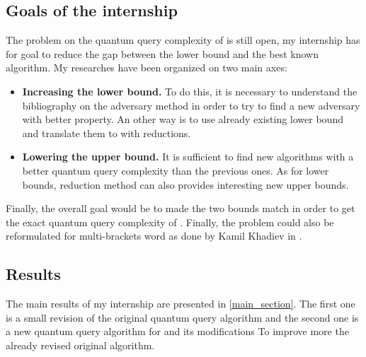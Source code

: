 \subsection{Goals of the internship}
The problem on the quantum query complexity of  is still open, my internship
has for goal to reduce the gap between the lower bound and the best known algorithm.
My researches have been organized on two main axes:
\begin{itemize}
    \item \textbf{Increasing the lower bound.} To do this, it is necessary to understand the bibliography
          on the adversary method in order to try to find a new adversary with better property. An other
          way is to use already existing lower bound and translate them to  with reductions.
    \item \textbf{Lowering the upper bound.} It is sufficient to find new algorithms
          with a better quantum query complexity than the previous ones. As for lower bounds,
          reduction method can also provides interesting new upper bounds.
\end{itemize}
Finally, the overall goal would be to made the two bounds match in order to get the exact quantum
query complexity of . Finally, the problem could also be reformulated for multi-brackets word
as done by Kamil Khadiev in \cite{DBLP:conf/uc/KhadievK21}.

\subsection{Results}

The main results of my internship are presented in \autoref{main_section}. The first
one is a small revision of the original quantum query algorithm \cite{art:2DGrid}
and the second one is a new quantum query algorithm for  and its
modifications To improve more the already revised original algorithm.